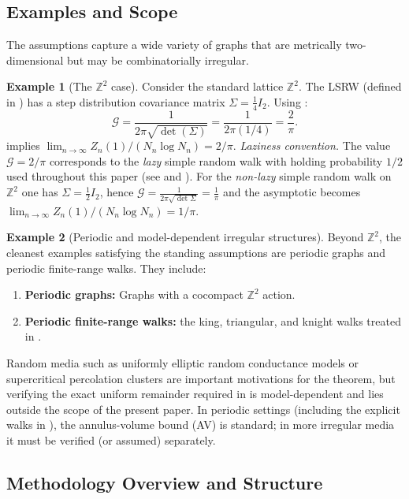 \documentclass[reqno]{amsart}
\numberwithin{equation}{section}
\theoremstyle{definition}
\newtheorem{example}[example]{Example}
\theoremstyle{remark}
\newcommand{\cG}{\mathcal{G}}
\begin{document}
\subsection{Examples and Scope}
The assumptions capture a wide variety of graphs that are metrically two-dimensional but may be combinatorially irregular.

\begin{example}[The $\mathbb{Z}^2$ case]\label{rem:pi2}
Consider the standard lattice $\mathbb{Z}^2$. The LSRW (defined in ) has a step distribution covariance matrix $\Sigma = \frac{1}{4} I_2$. Using :
\[
\cG = \frac{1}{2\pi \sqrt{\det(\Sigma)}} = \frac{1}{2\pi (1/4)} = \frac{2}{\pi}.
\]
 implies $\lim_{n \to \infty} Z_n(1) / (N_n \log N_n) = 2/\pi$.
%
\smallskip
\noindent\emph{Laziness convention.}
The value $\cG=2/\pi$ corresponds to the \emph{lazy} simple random walk with holding probability $1/2$ used throughout this paper (see  and ). For the \emph{non-lazy} simple random walk on $\mathbb{Z}^2$ one has $\Sigma=\tfrac{1}{2}I_2$, hence $\cG=\tfrac{1}{2\pi\sqrt{\det\Sigma}}=\tfrac{1}{\pi}$ and the asymptotic becomes $\lim_{n\to\infty} Z_n(1)/(N_n\log N_n)=1/\pi$.
\end{example}


\begin{example}[Periodic and model-dependent irregular structures]\label{ex:irregular}
Beyond $\mathbb{Z}^2$, the cleanest examples satisfying the standing assumptions are periodic graphs and periodic finite-range walks. They include:
\begin{enumerate}
    \item \textbf{Periodic graphs:} Graphs with a cocompact $\mathbb{Z}^2$ action.
    \item \textbf{Periodic finite-range walks:} the king, triangular, and knight walks treated in .
\end{enumerate}
Random media such as uniformly elliptic random conductance models or supercritical percolation clusters are important motivations for the theorem, but verifying the exact uniform remainder required in  is model-dependent and lies outside the scope of the present paper. In periodic settings (including the explicit walks in ), the annulus-volume bound (AV) is standard; in more irregular media it must be verified (or assumed) separately.
\end{example}


\subsection{Methodology Overview and Structure}
\end{document}

